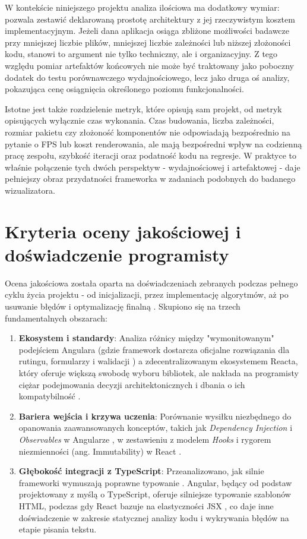 \documentclass[12pt,openright,twoside]{report}
\begin{document}
W kontekście niniejszego projektu analiza ilościowa ma dodatkowy wymiar: pozwala zestawić deklarowaną prostotę architektury z jej rzeczywistym kosztem implementacyjnym. Jeżeli dana aplikacja osiąga zbliżone możliwości badawcze przy mniejszej liczbie plików, mniejszej liczbie zależności lub niższej złożoności kodu, stanowi to argument nie tylko techniczny, ale i organizacyjny. Z tego względu pomiar artefaktów końcowych nie może być traktowany jako poboczny dodatek do testu porównawczego wydajnościowego, lecz jako druga oś analizy, pokazująca cenę osiągnięcia określonego poziomu funkcjonalności.

Istotne jest także rozdzielenie metryk, które opisują sam projekt, od metryk opisujących wyłącznie czas wykonania. Czas budowania, liczba zależności, rozmiar pakietu czy złożoność komponentów nie odpowiadają bezpośrednio na pytanie o FPS lub koszt renderowania, ale mają bezpośredni wpływ na codzienną pracę zespołu, szybkość iteracji oraz podatność kodu na regresje. W praktyce to właśnie połączenie tych dwóch perspektyw - wydajnościowej i artefaktowej - daje pełniejszy obraz przydatności frameworka w zadaniach podobnych do badanego wizualizatora.

\section{Kryteria oceny jakościowej i doświadczenie programisty}
Ocena jakościowa została oparta na doświadczeniach zebranych podczas pełnego cyklu życia projektu - od inicjalizacji, przez implementację algorytmów, aż po usuwanie błędów i optymalizację finalną \cite{Pragmatic_Programmer}. Skupiono się na trzech fundamentalnych obszarach:

\begin{enumerate}
    \item \textbf{Ekosystem i standardy}: Analiza różnicy między "wymonitowanym" podejściem Angulara (gdzie framework dostarcza oficjalne rozwiązania dla rutingu, formularzy i walidacji \cite{Angular_Docs}) a zdecentralizowanym ekosystemem Reacta, który oferuje większą swobodę wyboru bibliotek, ale nakłada na programisty ciężar podejmowania decyzji architektonicznych i dbania o ich kompatybilność \cite{Learning_React_Third}.
    \item \textbf{Bariera wejścia i krzywa uczenia}: Porównanie wysiłku niezbędnego do opanowania zaawansowanych konceptów, takich jak \textit{Dependency Injection} i \textit{Observables} w Angularze \cite{Angular_Development}, w zestawieniu z modelem \textit{Hooks} i rygorem niezmienności (ang. Immutability) w React \cite{React_Up_Running}.
    \item \textbf{Głębokość integracji z TypeScript}: Przeanalizowano, jak silnie frameworki wymuszają poprawne typowanie \cite{Learning_TS}. Angular, będący od podstaw projektowany z myślą o TypeScript, oferuje silniejsze typowanie szablonów HTML, podczas gdy React bazuje na elastyczności JSX \cite{Practical_Modern_JS}, co daje inne doświadczenie w zakresie statycznej analizy kodu i wykrywania błędów na etapie pisania tekstu.
\end{enumerate}
\end{document}
